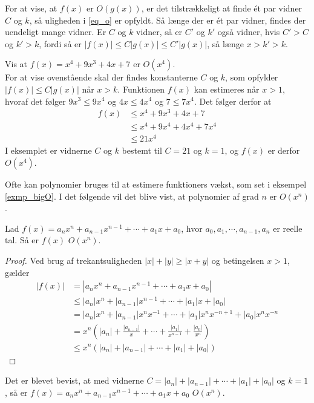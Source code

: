 For at vise, at $f(x)$ er $O(g(x))$, er det tilstrækkeligt at finde ét par vidner $C$ og $k$, så uligheden i \eqref{eq_o} er opfyldt. Så længe der er ét par vidner, findes der uendeligt mange vidner. Er $C$ og $k$ vidner, så er $C'$ og $k'$ også vidner, hvis $C'>C$ og $k'>k$, fordi så er $|f(x)| \leq C |g(x)| \leq C' |g(x)| $, så længe $x>k'>k$.  

\begin{exmp}\label{exmp_bigO}
Vis at $f(x)=x^4+9x^3+4x+7$ er $O(x^4)$. \\
For at vise ovenstående skal der findes konstanterne $C$ og $k$, som opfylder $|f(x)| \leq C |g(x)|$ når $x>k$. Funktionen $f(x)$ kan estimeres når $x>1$, hvoraf det følger $9x^3\leq 9x^4$ og $4x\leq 4x^4$ og $7\leq 7x^4$. Det følger derfor at 
\begin{align*}
f(x) &\leq x^4+9x^3+4x+7 \\
&\leq x^4+9x^4+4x^4+7x^4 \\
&\leq 21x^4
\end{align*}
I eksemplet er vidnerne $C$ og $k$ bestemt til $C=21$ og $k=1$, og $f(x)$ er derfor $O(x^4)$. 
\end{exmp} 
Ofte kan polynomier bruges til at estimere funktioners vækst, som set i eksempel \ref{exmp_bigO}. 
I det følgende vil det blive vist, at polynomier af grad $n$ er $O(x^n)$. \\
\begin{thm}
Lad $f(x)=a_nx^n+a_{n-1}x^{n-1}+\cdots +a_1x+a_0$, hvor $a_0, a_1, \cdots, a_{n-1}, a_n$ er reelle tal. 
Så er $f(x)$ $O(x^n)$.
\end{thm}

\begin{proof}
Ved brug af trekantsuligheden $|x| + |y| \geq |x + y|$ og betingelsen $x>1$, gælder
	\begin{align*}
		|f(x)| &= |a_nx^n+a_{n-1}x^{n-1}+ \cdots +a_1x+a_0| \\
		&\leq |a_n|x^n + |a_{n-1}| x^{n-1}+ \cdots + |a_1| x +|a_0| \\
		&= |a_n| x^n + |a_{n-1}| x^nx^{-1}+ \cdots + |a_1| x^n x^{-n+1}+|a_0| x^nx^{-n} \\
		&= x^n \left(|a_n| + \frac{|a_{n-1}|}{x}+ \cdots +\frac{|a_1|}{x^{n-1}}+\frac{|a_0|}{x^n} \right) \\
		&\leq x^n(|a_n| + |a_{n-1}| + \cdots + |a_1| + |a_0| )
	\end{align*}
\end{proof}
Det er blevet bevist, at med vidnerne $C= |a_n| + |a_{n-1}| + \cdots + |a_1| + |a_0|$ og $k=1$, så er $f(x)=a_nx^n+a_{n-1}x^{n-1}+\cdots +a_1x+a_0$ $O(x^n)$. \\

